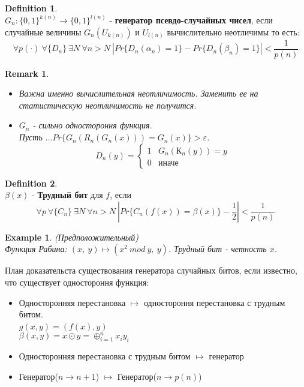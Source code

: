 \documentclass[a4paper]{article}
\theoremstyle{definition}
\newtheorem{definition}{Definition}
\theoremstyle{plain}
\newtheorem{remark}{Remark}
\newtheorem{example}{Example}
\begin{document}
\begin{definition}~\\
	$G_n \colon \{0, 1\}^{k(n)} \rightarrow \{0, 1\}^{l(n)}$ - \textbf{генератор псевдо-случайных чисел},
	если случайные величины $G_n(U_{k(n)})$ и $U_{l(n)}$ вычислительно неотличимы то есть:
	$$
		\forall p(\cdot)\ \forall \{D_n\}\ \exists N\ \forall n > N\ |Pr\{D_n(\alpha_n) = 1\} - Pr\{D_n(\beta_n) = 1\}| < \frac{1}{p(n)}	
	$$
\end{definition}

\begin{remark}~\\
	\begin{itemize}
		\item Важна именно вычислительная неотличимость. Заменить ее на статистическую неотличимость не получится.
		\item $G_n$ - сильно одностороння функция.~\\	
		Пусть $\ldots Pr\{G_n(R_n(G_n(x))) = G_n(x)\} > \varepsilon$.~\\
		\begin{equation*}
			D_n(y) =
 				\begin{cases}
   					1 &G_n(К_n(y)) = y\\
   					0 &\text{иначе}
 				\end{cases}
		\end{equation*}
	\end{itemize}
\end{remark}

\begin{definition}~\\
	$\beta(x)$ - \textbf{Трудный бит} для $f$, если
	$$
		\forall p\ \forall \{C_n\}\ \exists N\ \forall n > N\ |Pr\{C_n(f(x)) = \beta(x)\} - \frac{1}{2}| < \frac{1}{p(n)}	
	$$
\end{definition}

\begin{example}(Предположительный)~\\
	Функция Рабина: $(x,\ y) \mapsto (x^2\ mod\ y,\ y)$. Трудный бит - четность $x$. 
\end{example}

\noindent План доказательста существования генератора случайных битов, если известно, что существует одностороння функция:
\begin{itemize}
	\item Односторонняя перестановка $\mapsto$ одностороння перестановка с трудным битом.~\\
	$g(x, y) = (f(x), y)$~\\
	$\beta(x, y) = x \odot y = \oplus_{i = 1}^{n} x_i y_i$
	\item Односторонняя перестановка с трудным битом $\mapsto$ генератор
	\item Генератор($n \rightarrow n + 1$) $\mapsto$ Генератор($n \rightarrow p(n)$)
\end{itemize}
\end{document}
